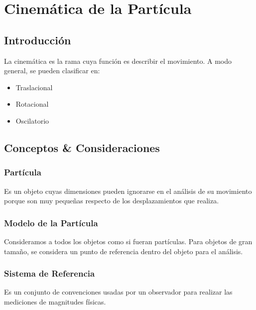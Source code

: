 \chapter{Cinemática de la Partícula}
\section{Introducción}
La cinemática es la rama cuya función es describir el movimiento.  
A modo general, se pueden clasificar en:
\begin{itemize}
    \item Traslacional
    \item Rotacional
    \item Oscilatorio
\end{itemize}
\section{Conceptos \& Consideraciones}
\subsection{Partícula}
Es un objeto cuyas dimensiones pueden ignorarse en el análisis de su movimiento porque son muy pequeñas respecto de los desplazamientos que realiza.
\subsection{Modelo de la Partícula}
Consideramos a todos los objetos como si fueran partículas.  
Para objetos de gran tamaño, se considera un punto de referencia dentro del objeto para el análisis.
\begin{center}
\end{center}
\subsection{Sistema de Referencia}
Es un conjunto de convenciones usadas por un observador para realizar las mediciones de magnitudes físicas.

